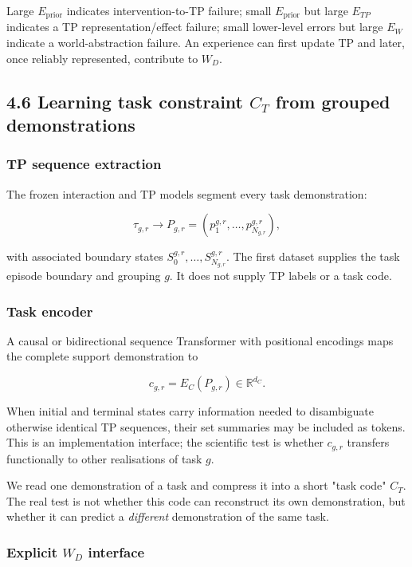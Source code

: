 \documentclass[11pt]{article}
\newenvironment{plainword}{%
  \par\medskip\noindent\begin{minipage}{\textwidth}%
  \color{gray!75!black}\small\itshape
}{%
  \end{minipage}\par\medskip}
\begin{document}
Large $E_{\mathrm{prior}}$ indicates intervention-to-TP failure; small $E_{\mathrm{prior}}$ but large $E_{TP}$ indicates a TP
representation/effect failure; small lower-level errors but large $E_W$ indicate a world-abstraction failure. An experience can first
update TP and later, once reliably represented, contribute to $W_D$.

\subsection*{4.6 Learning task constraint $C_T$ from grouped demonstrations}

\subsubsection*{TP sequence extraction}

The frozen interaction and TP models segment every task demonstration:

\[
\tau_{g,r}\longrightarrow
P_{g,r}=(p_1^{g,r},\ldots,p_{N_{g,r}}^{g,r}),
\]

with associated boundary states $S_0^{g,r},\ldots,S_{N_{g,r}}^{g,r}$. The first dataset supplies the task episode boundary and
grouping $g$. It does not supply TP labels or a task code.

\subsubsection*{Task encoder}

A causal or bidirectional sequence Transformer with positional encodings maps the complete support demonstration to

\[
\boxed{c_{g,r}=E_C(P_{g,r})\in\mathbb R^{d_C}.}
\]

When initial and terminal states carry information needed to disambiguate otherwise identical TP sequences, their set summaries may
be included as tokens. This is an implementation interface; the scientific test is whether $c_{g,r}$ transfers functionally to other
realisations of task $g$.

\begin{plainword}
We read one demonstration of a task and compress it into a short "task code" $C_T$. The real test is not whether this code can
reconstruct its own demonstration, but whether it can predict a \emph{different} demonstration of the same task.
\end{plainword}

\subsubsection*{Explicit $W_D$ interface}
\end{document}
